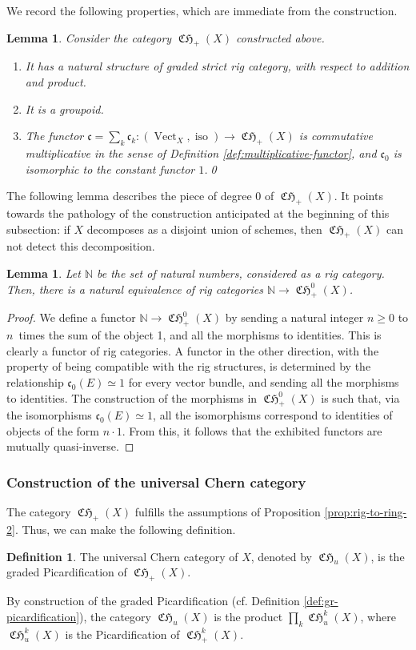 \documentclass[11pt]{article}
\newcommand{\cf}{cf.\xspace}
\theoremstyle{plain}
\newtheorem{lemma}[theorem]{Lemma}
\theoremstyle{definition}
\newtheorem{definition}[theorem]{Definition}
\newcommand{\NBbb}{\mathbb N}
\newcommand{\cfrak}{\mathfrak c}
\DeclareMathOperator{\CHfrak}{\mathfrak{CH}}
\DeclareMathOperator{\iso}{iso}
\DeclareMathOperator{\Vect}{Vect}
\begin{document}
We record the following properties, which are immediate from the construction.

\begin{lemma}\label{lemma:cfrak-CHplus}
Consider the category $\CHfrak_{+}(X)$ constructed above.

\begin{enumerate}
\item It has a natural structure of graded strict rig category, with respect to addition and product.
\item It is a groupoid.
\item The functor $\cfrak=\sum_{k}\cfrak_{k}\colon (\Vect_{X},\iso)\to\CHfrak_{+}(X)$ is commutative multiplicative in the sense of Definition \ref{def:multiplicative-functor}, and $\cfrak_{0}$ is isomorphic to the constant functor $1$.\qed
\end{enumerate}
\end{lemma}

The following lemma describes the piece of degree 0 of $\CHfrak_{+}(X)$. It points towards the pathology of the construction anticipated at the beginning of this subsection: if $X$ decomposes as a disjoint union of schemes, then $\CHfrak_{+}(X)$ can not detect this decomposition.

\begin{lemma}\label{lemma:CHplus0-N}
Let $\NBbb$ be the set of natural numbers, considered as a rig category. Then, there is a natural equivalence of rig categories $\NBbb\to\CHfrak_{+}^{0}(X)$.
\end{lemma}
\begin{proof}
We define a functor $\NBbb\to\CHfrak_{+}^{0}(X)$ by sending a natural integer $n\geq 0$ to $n$~times the sum of the object 1, and all the morphisms to identities. This is clearly a functor of rig categories. A functor in the other direction, with the property of being compatible with the rig structures, is determined by the relationship $\cfrak_{0}(E)\simeq 1$ for every vector bundle, and sending all the morphisms to identities. The construction of the morphisms in $\CHfrak^{0}_{+}(X)$ is such that, via the isomorphisms $\cfrak_{0}(E)\simeq 1$, all the isomorphisms correspond to identities of objects of the form $n\cdot 1$. From this, it follows that the exhibited functors are mutually quasi-inverse.
\end{proof}

\subsubsection{Construction of the universal Chern category} The category $\CHfrak_{+}(X)$ fulfills the assumptions of Proposition \ref{prop:rig-to-ring-2}. Thus, we can make the following definition.
\begin{definition}
The universal Chern category of $X$, denoted by $\CHfrak_{u}(X)$, is the graded Picardification of $\CHfrak_{+}(X)$.
\end{definition}
By construction of the graded Picardification (\cf Definition \ref{def:gr-picardification}), the category $\CHfrak_{u}(X)$ is the product $\prod_{k}\CHfrak_{u}^{k}(X)$, where $\CHfrak_{u}^{k}(X)$ is the Picardification of $\CHfrak_{+}^{k}(X)$.
\end{document}
